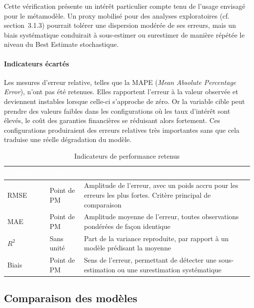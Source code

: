 Cette vérification présente un intérêt particulier compte tenu de l'usage envisagé pour le 
métamodèle. Un proxy mobilisé pour des analyses exploratoires (cf. section~3.1.3) pourrait 
tolérer une dispersion modérée de ses erreurs, mais un biais systématique conduirait à 
sous-estimer ou surestimer de manière répétée le niveau du Best Estimate stochastique.

\paragraph{Indicateurs écartés}
Les mesures d'erreur relative, telles que la MAPE (\textit{Mean Absolute Percentage 
Error}), n'ont pas été retenues. Elles rapportent l'erreur à la valeur observée et 
deviennent instables lorsque celle-ci s'approche de zéro. Or la variable cible peut prendre 
des valeurs faibles dans les configurations où les taux d'intérêt sont élevés, le coût des 
garanties financières se réduisant alors fortement. Ces configurations produiraient des 
erreurs relatives très importantes sans que cela traduise une réelle dégradation du modèle.

\begin{table}[H]
\centering
\caption{Indicateurs de performance retenus}
\label{tab:indicateurs-performance}
\renewcommand{\arraystretch}{1.3}
\begin{tabular}{p{2.4cm} p{2.6cm} p{8.4cm}}
\toprule
\rowcolor{rougeEntreprise}
\textcolor{white}{\textbf{Indicateur}} &
\textcolor{white}{\textbf{Unité}} &
\textcolor{white}{\textbf{Lecture}} \\
\midrule
RMSE & Point de PM & 
Amplitude de l'erreur, avec un poids accru pour les erreurs les plus fortes. Critère 
principal de comparaison \\
\addlinespace
\rowcolor{rosePale}
MAE & Point de PM & 
Amplitude moyenne de l'erreur, toutes observations pondérées de façon identique \\
\addlinespace
$R^2$ & Sans unité & 
Part de la variance reproduite, par rapport à un modèle prédisant la moyenne \\
\addlinespace
\rowcolor{rosePale}
Biais & Point de PM & 
Sens de l'erreur, permettant de détecter une sous-estimation ou une surestimation 
systématique \\
\bottomrule
\end{tabular}
\end{table}

\subsection{Comparaison des modèles}
\label{subsec:comparaison-modeles}

